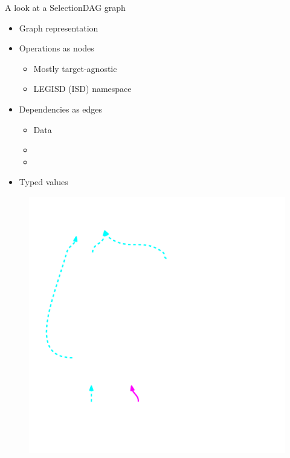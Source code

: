 \begin{frame}{A look at a SelectionDAG graph}

\begin{minipage}[t]{0.50\linewidth}
    \begin{itemize}
        \item Graph representation
        \item Operations as nodes
        \begin{itemize}
            \item Mostly target-agnostic
            \item LEGISD (ISD) namespace
        \end{itemize}
        \item Dependencies as edges
        \begin{itemize}
            \item Data
            \item {}
            \item {}
        \end{itemize}
        \item Typed values
    \end{itemize}
\end{minipage}
\begin{minipage}[t]{0.49\linewidth}
    \begin{figure}
        \vspace{-2.2ex}
        \includegraphics[width = 1.0\textwidth]{examples/ex1b/ex1b-pre-isel.pdf}
    \end{figure}
\end{minipage}


\end{frame}

